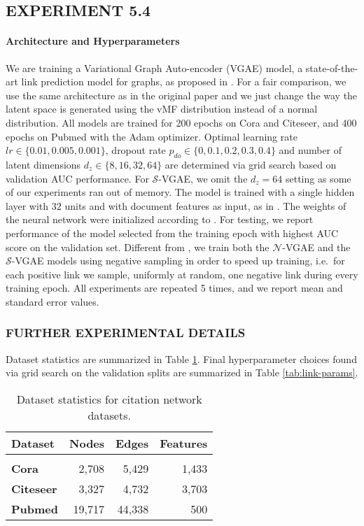 \documentclass[letterpaper]{article}
\newcommand{\Sv}{$\mathcal{S}$}
\newcommand{\Nv}{$\mathcal{N}$}
\begin{document}
\subsection{EXPERIMENT 5.4}\label{ap:link-pred}
\paragraph{Architecture and Hyperparameters} We are training a Variational Graph Auto-encoder (VGAE) model, a state-of-the-art link prediction model for graphs, as proposed in \citet{kipf2016VGAE}. For a fair comparison, we use the same architecture as in the original paper and we just change the way the latent space is generated using the vMF distribution instead of a normal distribution. All models are trained for 200 epochs on Cora and Citeseer, and 400 epochs on Pubmed with the Adam optimizer. Optimal learning rate $lr\in\{0.01, 0.005, 0.001\}$, dropout rate $p_{do}\in \{0, 0.1, 0.2, 0.3, 0.4\}$ and number of latent dimensions $d_z\in \{8,16,32,64\}$ are determined via grid search based on validation AUC performance. For \Sv-VGAE, we omit the $d_z=64$ setting as some of our experiments ran out of memory. The model is trained with a single hidden layer with $32$ units and with document features as input, as in \citet{kipf2016VGAE}. The weights of the neural network were initialized according to \citep{glorot2010understanding}. For testing, we report performance of the model selected from the training epoch with highest AUC score on the validation set. Different from \citep{kipf2016VGAE}, we train both the \Nv-VGAE and the \Sv-VGAE models using negative sampling in order to speed up training, i.e.~for each positive link we sample, uniformly at random, one negative link during every training epoch. All experiments are repeated 5 times, and we report mean and standard error values.

\subsubsection{FURTHER EXPERIMENTAL DETAILS}
Dataset statistics are summarized in Table \ref{tab:link-datasets}. Final hyperparameter choices found via grid search on the validation splits are summarized in Table \ref{tab:link-params}.

\begin{table}[htp]
\centering
\caption{\label{tab:link-datasets}Dataset statistics for citation network datasets.}
\bigskip
\begin{tabular}{l r r r}
\toprule
Dataset & Nodes & Edges  & Features \\[0.05em]\hline \\[-0.8em]
\textbf{Cora} & 2,708 & 5,429 & 1,433 \\
\textbf{Citeseer} & 3,327 & 4,732 & 3,703 \\
\textbf{Pubmed} & 19,717 & 44,338 & 500 \\
\bottomrule
\end{tabular}
\end{table}
\end{document}
